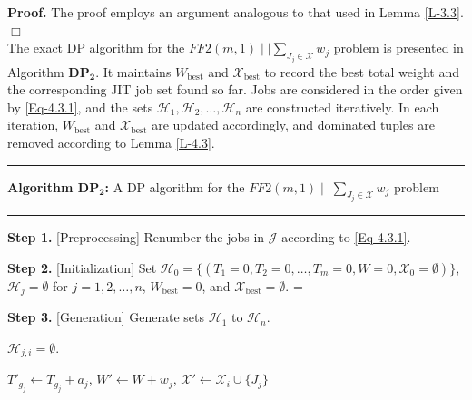 \documentclass[12pt, eqno, limlimits]{article}
\begin{document}
\begin{sloppypar}
        \noindent \textbf{Proof.} The proof employs an argument analogous to that used in Lemma \ref{L-3.3}.  \hfill$\Box$\\
        
        The exact DP algorithm for the $FF2(m, 1)\mid \mid \sum_{J_j \in \mathcal{X}} w_j$ problem is presented in Algorithm $\mathbf{DP_2}$. It maintains $W_{\text{best}}$ and $\mathcal{X}_{\text{best}}$ to record the best total weight and the corresponding JIT job set found so far. Jobs are considered in the order given by \eqref{Eq-4.3.1}, and the sets $\mathcal{H}_1, \mathcal{H}_{2}, \ldots, \mathcal{H}_{n}$ are constructed iteratively. In each iteration, $W_{\text{best}}$ and $\mathcal{X}_{\text{best}}$ are updated accordingly, and dominated tuples are removed according to Lemma \ref{L-4.3}.
        
        \begin{algorithm}[tbp]
            \small
            \linespread{1.2}\selectfont
            \SetAlgoLined
            \DontPrintSemicolon
            \hrule 
            \vspace{0.1cm}
            \textbf{Algorithm $\mathbf{DP_2}$:} A DP algorithm for the $FF2(m, 1)\mid \mid \sum_{J_j \in \mathcal{X}} w_j$ problem
            \vspace{0.1cm}
            \hrule 
            \vspace{0.1cm}
            \LinesNumbered 
            
            \textbf{Step 1.} [Preprocessing] Renumber the jobs in $\mathcal{J}$ according to \eqref{Eq-4.3.1}. \;
            
            \textbf{Step 2.} [Initialization] Set ${\mathcal H}_0=\{(T_1=0, T_2=0, \ldots, T_m=0, W=0, \mathcal{X}_0=\emptyset)\}$, $\mathcal{H}_j=\emptyset$ for $j=1, 2, \ldots, n$, $W_{\text{best}}=0$, and $\mathcal{X}_{\text{best}}=\emptyset$. \hspace*{\algorithmicindent}%
            \hangindent=\dimexpr{}\relax%
            
            \textbf{Step 3.} [Generation] Generate sets $\mathcal{H}_1$ to $\mathcal{H}_n$. \;
            
            {
                {
                    { $\mathcal{H}_{j,i}=\emptyset$.\;
                        
                        { 	
                            {
                                $T'_{g_j} \gets T_{g_j} + a_j$, $W' \gets W + w_j$, $\mathcal{X}' \gets \mathcal{X}_i \cup \{J_j\}$ \;
                                
}}}}}
\end{algorithm}
\end{sloppypar}
\end{document}
